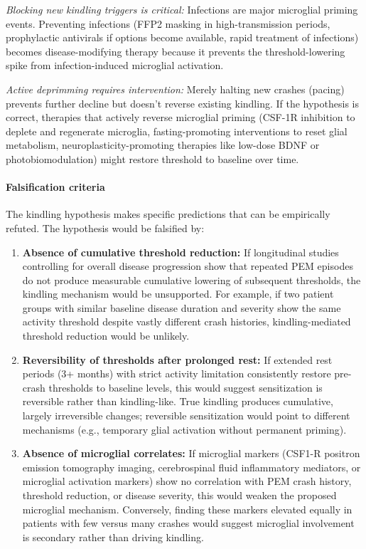 \begin{hypothesis}
\textit{Blocking new kindling triggers is critical:} Infections are major microglial priming events. Preventing infections (FFP2 masking in high-transmission periods, prophylactic antivirals if options become available, rapid treatment of infections) becomes disease-modifying therapy because it prevents the threshold-lowering spike from infection-induced microglial activation.

\textit{Active deprimming requires intervention:} Merely halting new crashes (pacing) prevents further decline but doesn't reverse existing kindling. If the hypothesis is correct, therapies that actively reverse microglial priming (CSF-1R inhibition to deplete and regenerate microglia, fasting-promoting interventions to reset glial metabolism, neuroplasticity-promoting therapies like low-dose BDNF or photobiomodulation) might restore threshold to baseline over time.

\paragraph{Falsification criteria}

The kindling hypothesis makes specific predictions that can be empirically refuted. The hypothesis would be falsified by:

\begin{enumerate}
    \item \textbf{Absence of cumulative threshold reduction:} If longitudinal studies controlling for overall disease progression show that repeated PEM episodes do not produce measurable cumulative lowering of subsequent thresholds, the kindling mechanism would be unsupported. For example, if two patient groups with similar baseline disease duration and severity show the same activity threshold despite vastly different crash histories, kindling-mediated threshold reduction would be unlikely.

    \item \textbf{Reversibility of thresholds after prolonged rest:} If extended rest periods (3+ months) with strict activity limitation consistently restore pre-crash thresholds to baseline levels, this would suggest sensitization is reversible rather than kindling-like. True kindling produces cumulative, largely irreversible changes; reversible sensitization would point to different mechanisms (e.g., temporary glial activation without permanent priming).

    \item \textbf{Absence of microglial correlates:} If microglial markers (CSF1-R positron emission tomography imaging, cerebrospinal fluid inflammatory mediators, or microglial activation markers) show no correlation with PEM crash history, threshold reduction, or disease severity, this would weaken the proposed microglial mechanism. Conversely, finding these markers elevated equally in patients with few versus many crashes would suggest microglial involvement is secondary rather than driving kindling.


\end{enumerate}
\end{hypothesis}
